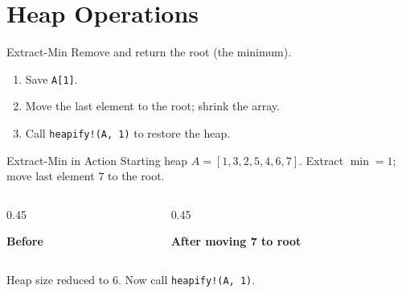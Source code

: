 \documentclass[10pt,aspectratio=169]{beamer}
\begin{document}
\section{Heap Operations}

\begin{frame}{Extract-Min}
  Remove and return the root (the minimum).

  \begin{enumerate}
    \item Save \texttt{A[1]}.
    \item Move the \alert{last} element to the root; shrink the array.
    \item Call \texttt{heapify!(A, 1)} to restore the heap.
  \end{enumerate}
\end{frame}

\begin{frame}{Extract-Min in Action}
  Starting heap $A = [1,3,2,5,4,6,7]$.
  Extract $\min = 1$; move last element $7$ to the root.

  \bigskip
  \begin{columns}[c]
    \begin{column}{0.45\textwidth}
      \begin{center}
        \textbf{Before}\\[4pt]
      \end{center}
    \end{column}
    \begin{column}{0.45\textwidth}
      \begin{center}
        \textbf{After moving 7 to root}\\[4pt]
      \end{center}
    \end{column}
  \end{columns}

  \bigskip
  \begin{center}
    Heap size reduced to 6. Now call \texttt{heapify!(A, 1)}.
  \end{center}
\end{frame}
\end{document}
